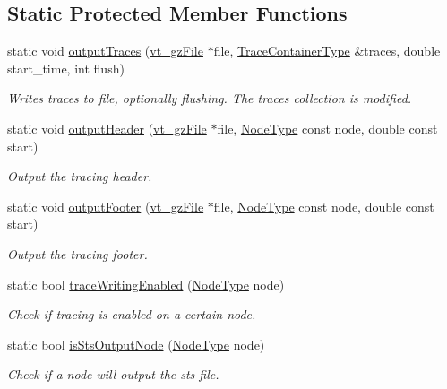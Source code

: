 \subsection*{Static Protected Member Functions}
\begin{DoxyCompactItemize}
\item 
static void \hyperlink{structvt_1_1trace_1_1_trace_lite_a90769de4b190c30fb016990f36ef032e}{output\+Traces} (\hyperlink{structvt_1_1trace_1_1vt__gz_file}{vt\+\_\+gz\+File} $\ast$file, \hyperlink{structvt_1_1trace_1_1_trace_lite_a346a7751a544de425345a8983ed52146}{Trace\+Container\+Type} \&traces, double start\+\_\+time, int flush)
\begin{DoxyCompactList}\small\item\em Writes traces to file, optionally flushing. The traces collection is modified. \end{DoxyCompactList}\item 
static void \hyperlink{structvt_1_1trace_1_1_trace_lite_af48d0cba490b7d15dc35ee2cfcc88a3f}{output\+Header} (\hyperlink{structvt_1_1trace_1_1vt__gz_file}{vt\+\_\+gz\+File} $\ast$file, \hyperlink{namespacevt_a866da9d0efc19c0a1ce79e9e492f47e2}{Node\+Type} const node, double const start)
\begin{DoxyCompactList}\small\item\em Output the tracing header. \end{DoxyCompactList}\item 
static void \hyperlink{structvt_1_1trace_1_1_trace_lite_af0dc30a8b2b52fc291d90f606f585a2d}{output\+Footer} (\hyperlink{structvt_1_1trace_1_1vt__gz_file}{vt\+\_\+gz\+File} $\ast$file, \hyperlink{namespacevt_a866da9d0efc19c0a1ce79e9e492f47e2}{Node\+Type} const node, double const start)
\begin{DoxyCompactList}\small\item\em Output the tracing footer. \end{DoxyCompactList}\item 
static bool \hyperlink{structvt_1_1trace_1_1_trace_lite_aaf2192758f67bc57ab66766523bd96ad}{trace\+Writing\+Enabled} (\hyperlink{namespacevt_a866da9d0efc19c0a1ce79e9e492f47e2}{Node\+Type} node)
\begin{DoxyCompactList}\small\item\em Check if tracing is enabled on a certain node. \end{DoxyCompactList}\item 
static bool \hyperlink{structvt_1_1trace_1_1_trace_lite_acfad34ebd68c53547dcff4115dd54388}{is\+Sts\+Output\+Node} (\hyperlink{namespacevt_a866da9d0efc19c0a1ce79e9e492f47e2}{Node\+Type} node)
\begin{DoxyCompactList}\small\item\em Check if a node will output the sts file. \end{DoxyCompactList}\end{DoxyCompactItemize}
